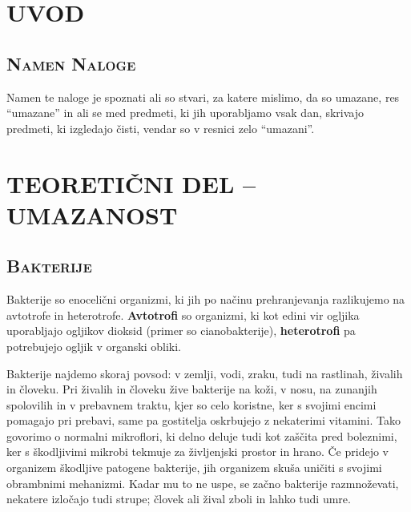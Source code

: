 \documentclass[12pt, a4paper, oneside]{report}
\begin{document}

\tableofcontents

\pagestyle{fancy}
\chead{}


\chapter{UVOD}

\section{\textsc{Namen Naloge}}

Namen te naloge je spoznati ali so stvari, za katere mislimo, da so umazane, res ``umazane'' in ali se med predmeti, ki jih uporabljamo vsak dan, skrivajo predmeti, ki izgledajo čisti, vendar so v resnici zelo ``umazani''.

\chapter{TEORETIČNI DEL -- UMAZANOST}

\section{\textsc{Bakterije}}

Bakterije so enocelični organizmi, ki jih po načinu prehranjevanja razlikujemo na avtotrofe in heterotrofe. \textbf{Avtotrofi} so organizmi, ki kot edini vir ogljika uporabljajo ogljikov dioksid (primer so cianobakterije), \textbf{heterotrofi} pa potrebujejo ogljik v organski obliki.

Bakterije najdemo skoraj povsod: v zemlji, vodi, zraku, tudi na rastlinah, živalih in človeku. Pri živalih in človeku žive bakterije na koži, v nosu, na zunanjih spolovilih in v prebavnem traktu, kjer so celo koristne, ker s svojimi encimi pomagajo pri prebavi, same pa gostitelja oskrbujejo z nekaterimi vitamini. Tako govorimo o normalni mikroflori, ki delno deluje tudi kot zaščita pred boleznimi, ker s škodljivimi mikrobi tekmuje za življenjski prostor in hrano. Če pridejo v organizem škodljive patogene bakterije, jih organizem skuša uničiti s svojimi obrambnimi mehanizmi. Kadar mu to ne uspe, se začno bakterije razmnoževati, nekatere izločajo tudi strupe; človek ali žival zboli in lahko tudi umre.
\end{document}
